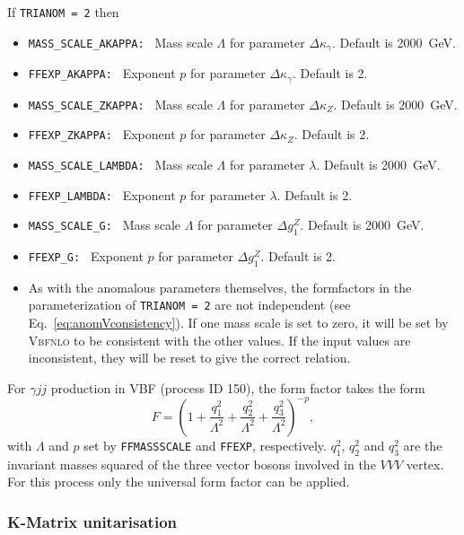 \documentclass[english,12pt]{article}
\begin{document}
If {\tt TRIANOM = 2} then
\begin{itemize}
 \item {\tt MASS\_SCALE\_AKAPPA: } Mass scale $\Lambda$ for parameter $\Delta
\kappa_{\gamma}$.  Default is 2000~GeV.
 \item {\tt FFEXP\_AKAPPA: } Exponent $p$ for parameter $\Delta \kappa_{\gamma}$.  Default
is 2.
 \item {\tt MASS\_SCALE\_ZKAPPA: } Mass scale $\Lambda$ for parameter $\Delta
\kappa_{Z}$.  Default is 2000~GeV.
 \item {\tt FFEXP\_ZKAPPA: } Exponent $p$ for parameter $\Delta \kappa_{Z}$.  Default
is 2.
 \item {\tt MASS\_SCALE\_LAMBDA: } Mass scale $\Lambda$ for parameter $\lambda$.
 Default is 2000~GeV.
 \item {\tt FFEXP\_LAMBDA: } Exponent $p$ for parameter $\lambda$.  Default is
2.
 \item {\tt MASS\_SCALE\_G: } Mass scale $\Lambda$ for parameter $\Delta g_{1}^{Z}$. 
Default is 2000~GeV.
 \item {\tt FFEXP\_G: } Exponent $p$ for parameter $\Delta g_{1}^{Z}$.  Default is 2.
 \item As with the anomalous parameters themselves, the formfactors in the
parameterization of {\tt TRIANOM = 2} are not independent (see
Eq.~\eqref{eq:anomVconsistency}).  If one mass scale is set to zero, it will be
set by \textsc{Vbfnlo} to be consistent with the other values.  If the input
values are inconsistent, they will be reset to give the correct relation.
\end{itemize}

For $\gamma jj$ production in VBF (process ID 150), the form factor takes the form
\begin{equation}
 F = \left(1 + \frac{q_1^2}{\Lambda^{2}} + \frac{q_2^2}{\Lambda^{2}} + \frac{q_3^2}{\Lambda^{2}} \right)^{-p},
\end{equation}
with $\Lambda$ and $p$ set by {\tt FFMASSSCALE} and {\tt FFEXP}, respectively.
$q_1^2$, $q_2^2$ and $q_3^2$ are the invariant masses squared of the three vector bosons involved in the
$VVV$ vertex.
For this process only the universal form factor can be applied.

\subsubsection{K-Matrix unitarisation}
\label{sec:kmatrix}
\end{document}

